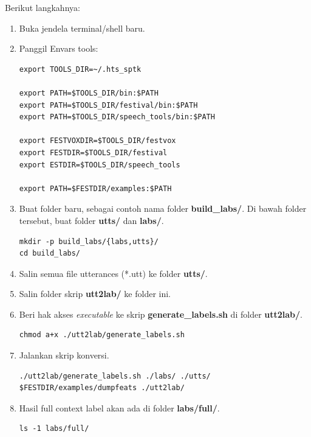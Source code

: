\documentclass[12pt,]{article}
\begin{document}
	Berikut langkahnya:
	\begin{enumerate}
		\item Buka jendela terminal/shell baru.
		
		\item Panggil Envars tools:
		\begin{verbatim}
export TOOLS_DIR=~/.hts_sptk

export PATH=$TOOLS_DIR/bin:$PATH
export PATH=$TOOLS_DIR/festival/bin:$PATH
export PATH=$TOOLS_DIR/speech_tools/bin:$PATH

export FESTVOXDIR=$TOOLS_DIR/festvox
export FESTDIR=$TOOLS_DIR/festival
export ESTDIR=$TOOLS_DIR/speech_tools

export PATH=$FESTDIR/examples:$PATH
		\end{verbatim}
		
		\item Buat folder baru, sebagai contoh nama folder \textbf{build\_labs/}.
		Di bawah folder tersebut, buat folder \textbf{utts/} dan \textbf{labs/}.
		\begin{verbatim}
mkdir -p build_labs/{labs,utts}/
cd build_labs/
		\end{verbatim}
		
		\item Salin semua file utterances (*.utt) ke folder \textbf{utts/}.
		
		\item Salin folder skrip \textbf{utt2lab/} ke folder ini.
		
		\item Beri hak akses \textit{executable} ke skrip \textbf{generate\_labels.sh} di folder \textbf{utt2lab/}.
		\begin{verbatim}
chmod a+x ./utt2lab/generate_labels.sh
		\end{verbatim}		
		
		\item Jalankan skrip konversi.
		\begin{verbatim}
./utt2lab/generate_labels.sh ./labs/ ./utts/ $FESTDIR/examples/dumpfeats ./utt2lab/
		\end{verbatim}
		
		\item Hasil full context label akan ada di folder \textbf{labs/full/}.
		\begin{verbatim}
ls -1 labs/full/
		\end{verbatim}

	\end{enumerate}
\end{document}
